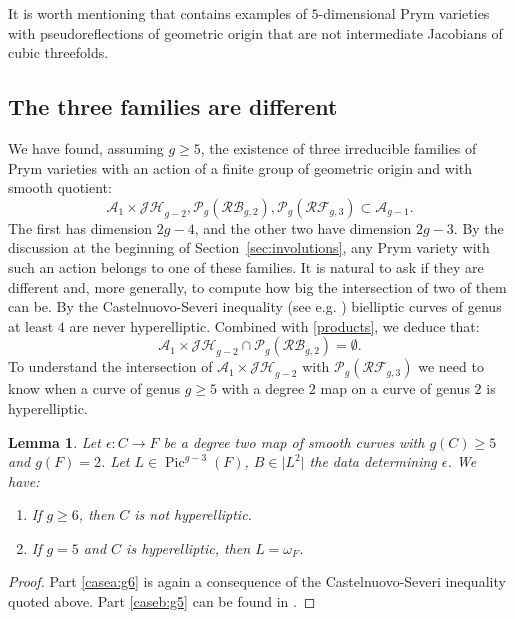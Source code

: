 \documentclass[preprint,12pt]{amsart}
\def\cA{\ensuremath{\mathcal{A}}}
\def\cP{\ensuremath{\mathcal{P}}}
\DeclareMathOperator{\Pic}{Pic}
\theoremstyle{plain}
\newtheorem{lemma}[lemma]{Lemma}
\theoremstyle{definition}
\begin{document}
It is worth mentioning that \cite{bo26} contains examples of $5$-dimensional Prym varieties with pseudoreflections of geometric origin that are not intermediate Jacobians of cubic threefolds.


\subsection{The three families are different}\label{different}
We have found, assuming $g\ge 5$, the existence of three irreducible families of Prym varieties with an action of a finite group of geometric origin and with smooth quotient: 
\[
\cA_1 \times \mathcal {JH}_{g-2}, \cP_g(\mathcal {RB}_{g,2}), \cP_g(\mathcal {RF}_{g,3}) \subset \cA_{g-1}.
\]
The first has dimension $2g-4$, and the other two have dimension $2g-3$.
By the discussion at the beginning of Section~\ref{sec:involutions}, any Prym variety with such an action belongs to one of these families.
It is natural to ask if they are different and, more generally, to compute how big the intersection of two of them can be. By the Castelnuovo-Severi inequality (see e.g. \cite[Theorem~3.5]{Ac})
 bielliptic curves of genus at least $4$ are never hyperelliptic.
Combined with \autoref{products}, we deduce that:
\[
\cA_1 \times \mathcal {JH}_{g-2} \cap \cP_g(\mathcal {RB}_{g,2}) = \emptyset.
\]
To understand the intersection of $\cA_1 \times \mathcal {JH}_{g-2}$ with $ \cP_g(\mathcal {RF}_{g,3}) $ we need to know when a curve of genus $g\ge 5$ with a degree $2$ map on a curve of genus $2$ is hyperelliptic.

\begin{lemma}\label{lem:hyper}
Let $\epsilon : C\rightarrow F$ be a degree two map of smooth curves with $g(C)\ge 5$ and $g(F)=2$.
Let $L\in \Pic ^{g-3}(F)$, $B\in \vert L^2 \vert$ the data determining $\epsilon $.
We have:
\begin{enumerate}
 \item\label{casea:g6} If $g\ge 6$, then $C$ is not hyperelliptic.
 \item\label{caseb:g5} If $g=5$ and $C$ is hyperelliptic, then $L=\omega_F$.
\end{enumerate}
\end{lemma}


\begin{proof}
Part \eqref{casea:g6} is again a consequence of the Castelnuovo-Severi inequality quoted above.
Part \eqref{caseb:g5} can be found in \cite[Proposition~3.2]{bo}.
\end{proof}
\end{document}
